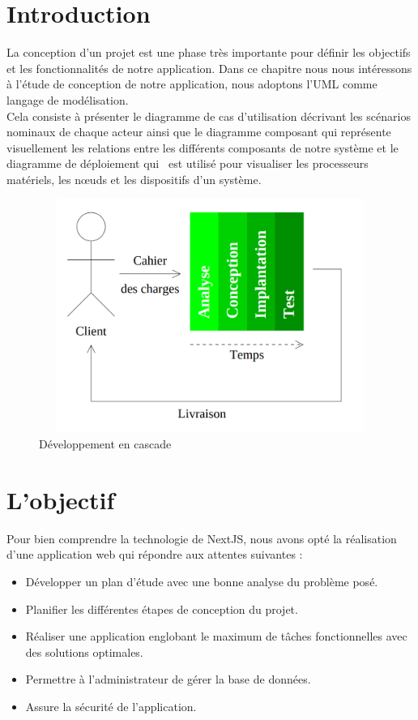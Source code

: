 \documentclass[12pt]{report}
\begin{document}
\newpage

\section{Introduction}
\hspace*{0.16in}
La conception d’un projet est une phase très importante pour définir les objectifs et les fonctionnalités de notre application. Dans ce chapitre nous nous intéressons à l’étude de conception de notre application, nous adoptons l’UML comme langage de modélisation.
\\
\hspace*{0.16in}
Cela consiste à présenter le diagramme de cas d’utilisation décrivant les scénarios nominaux de chaque acteur ainsi que le diagramme composant qui représente visuellement les relations entre les différents composants de notre système et le diagramme de déploiement qui  est utilisé pour visualiser les processeurs matériels, les nœuds et les dispositifs d’un système.

\vspace{0.1in}

\begin{figure}[h]
\centering
    \includegraphics[width = 5in, height = 3in]{../images/analyse_conception.png}
\caption{Développement en cascade}
\end{figure}

\section{L'objectif}
\hspace*{0.16in}
Pour bien comprendre la technologie de NextJS, nous avons opté la réalisation d’une application web qui répondre aux attentes suivantes :

\begin{itemize}
    \item Développer un plan d’étude avec une bonne analyse du problème posé.
    \item Planifier les différentes étapes de conception du projet.
    \item Réaliser une application englobant le maximum de tâches fonctionnelles avec des solutions optimales.
    \item Permettre à l’administrateur de gérer la base de données.
    \item Assure la sécurité de l'application.
\end{itemize}
\end{document}
